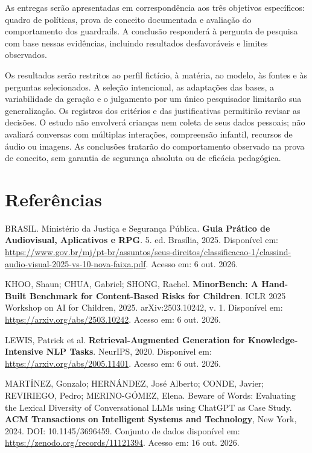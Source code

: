 \documentclass[12pt,openany,oneside,a4paper,english,brazil]{abntex2}
\begin{document}
As entregas serão apresentadas em correspondência aos três objetivos específicos: quadro de políticas, prova de conceito documentada e avaliação do comportamento dos guardrails. A conclusão responderá à pergunta de pesquisa com base nessas evidências, incluindo resultados desfavoráveis e limites observados.

Os resultados serão restritos ao perfil fictício, à matéria, ao modelo, às fontes e às perguntas selecionados. A seleção intencional, as adaptações das bases, a variabilidade da geração e o julgamento por um único pesquisador limitarão sua generalização. Os registros dos critérios e das justificativas permitirão revisar as decisões. O estudo não envolverá crianças nem coleta de seus dados pessoais; não avaliará conversas com múltiplas interações, compreensão infantil, recursos de áudio ou imagens. As conclusões tratarão do comportamento observado na prova de conceito, sem garantia de segurança absoluta ou de eficácia pedagógica.

\postextual
\chapter*{Referências}
\begingroup
\SingleSpacing
\setlength{\parindent}{0pt}
\setlength{\parskip}{12pt}

BRASIL. Ministério da Justiça e Segurança Pública. \textbf{Guia Prático de Audiovisual, Aplicativos e RPG}. 5. ed. Brasília, 2025. Disponível em: \url{https://www.gov.br/mj/pt-br/assuntos/seus-direitos/classificacao-1/classind-audio-visual-2025-vs-10-nova-faixa.pdf}. Acesso em: 6 out. 2026.

KHOO, Shaun; CHUA, Gabriel; SHONG, Rachel. \textbf{MinorBench: A Hand-Built Benchmark for Content-Based Risks for Children}. ICLR 2025 Workshop on AI for Children, 2025. arXiv:2503.10242, v. 1. Disponível em: \url{https://arxiv.org/abs/2503.10242}. Acesso em: 6 out. 2026.

LEWIS, Patrick et al. \textbf{Retrieval-Augmented Generation for Knowledge-Intensive NLP Tasks}. NeurIPS, 2020. Disponível em: \url{https://arxiv.org/abs/2005.11401}. Acesso em: 6 out. 2026.

MARTÍNEZ, Gonzalo; HERNÁNDEZ, José Alberto; CONDE, Javier; REVIRIEGO, Pedro; MERINO-GÓMEZ, Elena. Beware of Words: Evaluating the Lexical Diversity of Conversational LLMs using ChatGPT as Case Study. \textbf{ACM Transactions on Intelligent Systems and Technology}, New York, 2024. DOI: 10.1145/3696459. Conjunto de dados disponível em: \url{https://zenodo.org/records/11121394}. Acesso em: 16 out. 2026.
\end{document}
